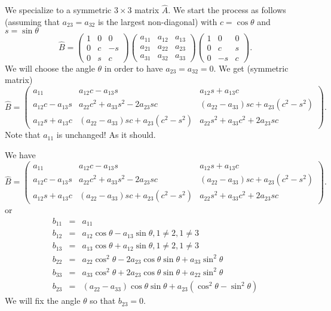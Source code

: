 We specialize to a symmetric $3\times 3 $ matrix $\hat{A}$.
We start the process as follows (assuming that $a_{23}=a_{32}$ is the largest non-diagonal)
with $c=\cos{\theta}$ and $s=\sin{\theta}$
%
\[
 \hat{B} =
      \left( \begin{array}{ccc} 
                1 & 0 & 0    \\
                0 & c & -s     \\
                0 & s & c
             \end{array} \right)\left( \begin{array}{ccc} 
                a_{11} & a_{12} & a_{13}    \\
                a_{21} & a_{22} & a_{23}     \\
                a_{31} & a_{32} & a_{33}
             \end{array} \right)
              \left( \begin{array}{ccc} 
                1 & 0 & 0    \\
                0 & c & s     \\
                0 & -s & c
             \end{array} \right).
\]
We will choose the angle $\theta$ in order to have $a_{23}=a_{32}=0$.
We get (symmetric matrix)
\[
 \hat{B} =\left( \begin{array}{ccc} 
                a_{11} & a_{12}c -a_{13}s& a_{12}s+a_{13}c    \\
                a_{12}c -a_{13}s & a_{22}c^2+a_{33}s^2 -2a_{23}sc& (a_{22}-a_{33})sc +a_{23}(c^2-s^2)     \\
                a_{12}s+a_{13}c & (a_{22}-a_{33})sc +a_{23}(c^2-s^2) & a_{22}s^2+a_{33}c^2 +2a_{23}sc
             \end{array} \right).
\]
Note that $a_{11}$ is unchanged! As it should.



We have
\[
 \hat{B} =\left( \begin{array}{ccc} 
                a_{11} & a_{12}c -a_{13}s& a_{12}s+a_{13}c    \\
                a_{12}c -a_{13}s & a_{22}c^2+a_{33}s^2 -2a_{23}sc& (a_{22}-a_{33})sc +a_{23}(c^2-s^2)     \\
                a_{12}s+a_{13}c & (a_{22}-a_{33})sc +a_{23}(c^2-s^2) & a_{22}s^2+a_{33}c^2 +2a_{23}sc
             \end{array} \right).
\]
or
\begin{eqnarray*}
b_{11} &=& a_{11} \\
b_{12} &=& a_{12}\cos\theta - a_{13}\sin\theta , 1 \ne 2, 1 \ne 3 \\
b_{13} &=& a_{13}\cos\theta + a_{12}\sin\theta , 1 \ne 2, 1 \ne 3 \nonumber\\
b_{22} &=& a_{22}\cos^2\theta - 2a_{23}\cos\theta \sin\theta +a_{33}\sin^2\theta\nonumber\\
b_{33} &=& a_{33}\cos^2\theta +2a_{23}\cos\theta \sin\theta +a_{22}\sin^2\theta\nonumber\\
b_{23} &=& (a_{22}-a_{33})\cos\theta \sin\theta +a_{23}(\cos^2\theta-\sin^2\theta)\nonumber 
\end{eqnarray*}
We will fix the angle $\theta$ so that $b_{23}=0$.



